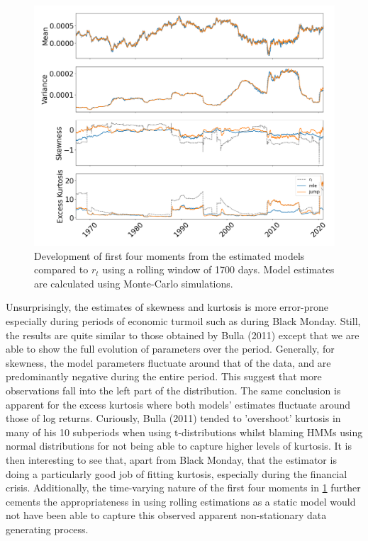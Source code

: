 \begin{figure}[H] 
    \centering
    \includegraphics[width=1.0\textwidth]{analysis/stylized_facts/images/moments_regular.png}
    \caption[Development of the first four moments from the estimated models and $r_t$]{Development of first four moments from the estimated models compared to $r_t$ using a rolling window of 1700 days. Model estimates are calculated using Monte-Carlo simulations.}
    \label{fig:stylized_facts_rolling_moments} 
\end{figure}

Unsurprisingly, the estimates of skewness and kurtosis is more error-prone especially during periods of economic turmoil such as during Black Monday. Still, the results are quite similar to those obtained by Bulla (2011) except that we are able to show the full evolution of parameters over the period. Generally, for skewness, the model parameters fluctuate around that of the data, and are predominantly negative during the entire period. This suggest that more observations fall into the left part of the distribution. The same conclusion is apparent for the excess kurtosis where both models' estimates fluctuate around those of log returns. Curiously, Bulla (2011) tended to 'overshoot' kurtosis in many of his 10 subperiods when using t-distributions whilst blaming HMMs using normal distributions for not being able to capture higher levels of kurtosis. It is then interesting to see that, apart from Black Monday, that the \jump estimator is doing a particularly good job of fitting kurtosis, especially during the financial crisis. Additionally, the time-varying nature of the first four moments in \cref{fig:stylized_facts_rolling_moments} further cements the appropriateness in using rolling estimations as a static model would not have been able to capture this observed apparent non-stationary data generating process.


